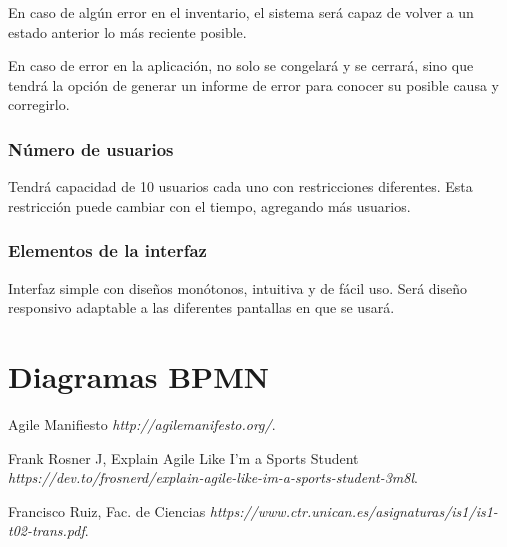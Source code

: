 \documentclass[12pt, fleqn]{report}                             %
\theoremstyle{break}                                            %
\begin{document}
            En caso de algún error en el inventario, el sistema será capaz de volver a un estado anterior lo más reciente posible.
            
            En caso de error en la aplicación, no solo se congelará y se cerrará, sino que tendrá la opción de generar un informe de error para conocer su posible causa y corregirlo. %
        
        \subsection{Número de usuarios}
        Tendrá capacidad de 10 usuarios cada uno con restricciones diferentes.
        Esta restricción puede cambiar con el tiempo, agregando más usuarios.
        
        
        
        \subsection{Elementos de la interfaz}
        Interfaz simple con diseños monótonos, intuitiva y de fácil uso.
        Será diseño responsivo adaptable a las diferentes pantallas en que se usará.





\chapter{Diagramas BPMN}








\begin{thebibliography}{10}

        Agile Manifiesto
        \textit{http://agilemanifesto.org/}. 

    	Frank Rosner J, Explain Agile Like I'm a Sports Student 
        \textit{https://dev.to/frosnerd/explain-agile-like-im-a-sports-student-3m8l}. 
        
        Francisco Ruiz, Fac. de Ciencias
        \textit{https://www.ctr.unican.es/asignaturas/is1/is1-t02-trans.pdf}. 

\end{thebibliography}
\end{document}
